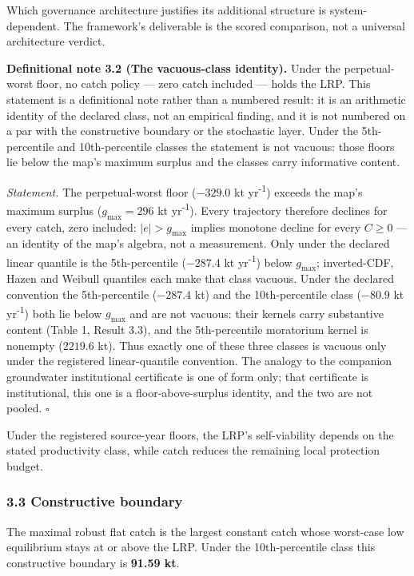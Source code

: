 \documentclass[11pt]{article}
\begin{document}
Which governance architecture justifies its additional structure is
system-dependent. The framework's deliverable is the scored comparison,
not a universal architecture verdict.

\textbf{Definitional note 3.2 (The vacuous-class identity).} Under the
perpetual-worst floor, no catch policy --- zero catch included --- holds
the LRP. This statement is a definitional note rather than a numbered
result: it is an arithmetic identity of the declared class, not an
empirical finding, and it is not numbered on a par with the constructive
boundary or the stochastic layer. Under the 5th-percentile and
10th-percentile classes the statement is not vacuous: those floors lie
below the map's maximum surplus and the classes carry informative
content.

\emph{Statement.} The perpetual-worst floor (\(-329.0\) kt yr\textsuperscript{-1}) exceeds
the map's maximum surplus (\(g_{\max} = 296\) kt yr\textsuperscript{-1}). Every trajectory
therefore declines for every catch, zero included: \(|e| > g_{\max}\)
implies monotone decline for every \(C \ge 0\) --- an identity of the
map's algebra, not a measurement. Only under the declared linear quantile is the 5th-percentile
($-287.4$ kt yr\textsuperscript{-1}) below $g_{\max}$; inverted-CDF,
Hazen and Weibull quantiles each make that class vacuous. Under the
declared convention the 5th-percentile ($-287.4$ kt) and the 10th-percentile class (\(-80.9\) kt yr\textsuperscript{-1}) both lie
below \(g_{\max}\) and are not vacuous: their kernels carry substantive
content (Table 1, Result 3.3), and the 5th-percentile moratorium kernel
is nonempty (\(2219.6\) kt). Thus exactly one of these three classes
is vacuous only under the registered linear-quantile convention. The
analogy to the companion groundwater institutional certificate is one of
form only; that certificate is institutional, this one is a
floor-above-surplus identity, and the two are not pooled. \ensuremath{\square}

Under the registered source-year floors, the LRP's self-viability depends
on the stated productivity class, while catch reduces the remaining local
protection budget.

\subsubsection{3.3 Constructive boundary}\label{budget-constructive-boundary}

The maximal robust flat catch is the largest constant catch whose
worst-case low equilibrium stays at or above the LRP. Under the
10th-percentile class this constructive boundary is \textbf{91.59 kt}.
\end{document}
